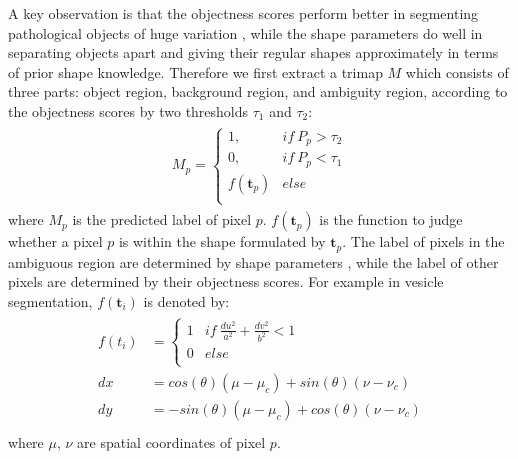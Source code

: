 A key observation is that the objectness scores perform better in segmenting pathological objects of huge variation , while the shape parameters do well in separating objects apart and giving their regular shapes approximately in terms of prior shape knowledge.
%
Therefore we first extract a trimap $M$ which consists of three parts: object region, background region, and ambiguity region, according to the objectness scores by two thresholds $\tau_1$ and $\tau_2$: 
%
\begin{eqnarray}\label{fusion}
\begin{aligned}
M_p=\left\{\begin{array}{cc}
1, & if~P_p>\tau_2\\
0, & if~P_p<\tau_1\\
f(\mathbf{t}_p) & else\\
\end{array}\right.
\end{aligned}
\end{eqnarray}
where $M_p$ is the predicted label of pixel $p$. 
%
$f(\mathbf{t}_p)$ is the function to judge whether a pixel $p$ is within the shape formulated by $\mathbf{t}_p$. 
%
The label of pixels in the ambiguous region are determined by shape parameters , while the label of other pixels are determined by their objectness scores.
%
For example in vesicle segmentation, $f(\mathbf{t}_i)$ is denoted by:
\begin{eqnarray}\label{fusion1}
\begin{aligned}
f(t_i)&=\left\{\begin{array}{cc}
1&if~\frac{du^2}{a^2}+\frac{dv^2}{b^2}<1\\
0&else\\
\end{array}\right.\\
dx &= cos(\theta)(\mu-\mu_c)+sin(\theta)(\nu-\nu_c)\\
dy &= -sin(\theta)(\mu-\mu_c)+cos(\theta)(\nu-\nu_c)\\
\end{aligned}
\end{eqnarray}
where $\mu$, $\nu$ are spatial coordinates of pixel $p$. 

